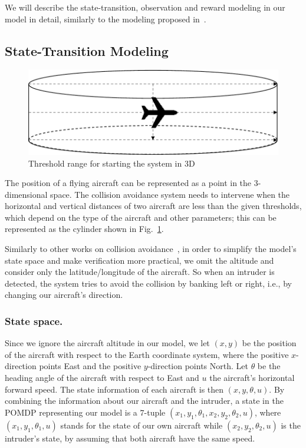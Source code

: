 \documentclass{article}
\begin{document}
We will describe the state-transition, observation and reward modeling in our model in detail, similarly to the modeling proposed in~\cite{DBLP:conf/rss/Bai-RSS-11}.


\subsection{State-Transition Modeling}
\label{ssec:stateTransitionModeling}

\begin{figure}[t] 
	\centering
	\includegraphics[width=0.40\linewidth]{3dsystem}
	\caption{Threshold range for starting the system in 3D}
	\label{fig:3dsystem}
\end{figure}
The position of a flying aircraft can be represented as a point in the 3-dimensional space.
The collision avoidance system needs to intervene when the horizontal and vertical distances of two aircraft are less than the given thresholds, which depend on the type of the aircraft and other parameters; 
this can be represented as the cylinder shown in Fig.~\ref{fig:3dsystem}.

Similarly to other works on collision avoidance~\cite{25,ACASX}, in order to simplify the model's state space and make verification more practical, we omit the altitude and consider only the latitude/longitude of the aircraft.
So when an intruder is detected, the system tries to avoid the collision by banking left or right, i.e., by changing our aircraft's direction.


\subsubsection{State space.}
Since we ignore the aircraft altitude in our model, we let $(x, y)$ be the position of the aircraft with respect to the Earth coordinate system, where the positive $x$-direction points East and the positive $y$-direction points North.
Let $\theta$ be the heading angle of the aircraft with respect to East and $u$ the aircraft's horizontal forward speed.
The state information of each aircraft is then $(x, y, \theta, u)$.
By combining the information about our aircraft and the intruder, a state in the POMDP representing our model is a $7$-tuple $(x_{1}, y_{1}, \theta_{1}, x_{2}, y_{2}, \theta_{2}, u)$, where $(x_{1}, y_{1}, \theta_{1}, u)$ stands for the state of our own aircraft while $(x_{2}, y_{2}, \theta_{2}, u)$ is the intruder's state, by assuming that both aircraft have the same speed.
\end{document}
